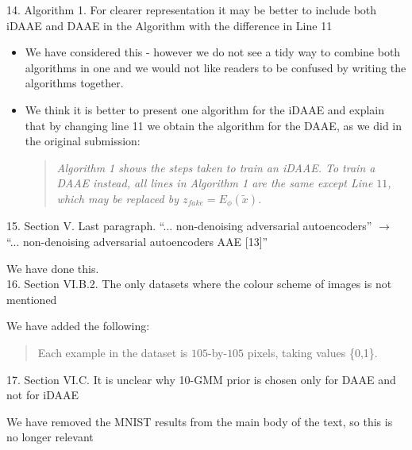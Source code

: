 \documentclass[a4paper,11pt]{article}
\begin{document}

{\color{blue}
14. Algorithm 1. For clearer representation it may be better to include both iDAAE and DAAE in the Algorithm with the difference in Line 11}

\begin{itemize}
    \item We have considered this - however we do not see a tidy way to combine both algorithms in one and we would not like readers to be confused by writing the algorithms together.
    \item We think it is better to present one algorithm for the iDAAE and explain that by changing line 11 we obtain the algorithm for the DAAE, as we did in the original submission:
    \begin{quote}
        {\it Algorithm 1 shows the steps taken to train an iDAAE. To train a DAAE instead, all lines in Algorithm 1 are the same except Line $11$, which may be replaced by $z_{fake} = E_\phi(\tilde{x})$.}
    \end{quote}
\end{itemize}

{\color{blue}
15. Section V. Last paragraph. ``... non-denoising adversarial autoencoders'' $\rightarrow$ ``... non-denoising adversarial autoencoders AAE [13]''} \newline

We have done this.\\

{\color{blue}
16. Section VI.B.2. The only datasets where the colour scheme of images is not mentioned} \newline

We have added the following: 
\begin{quote}
     {\color{red} Each example in the dataset is $105$-by-$105$ pixels, taking values \{0,1\}. }
\end{quote}

{\color{blue}
17. Section VI.C. It is unclear why 10-GMM prior is chosen only for DAAE and not for iDAAE} \newline

{\color{red} We have removed the MNIST results from the main body of the text, so this is no longer relevant}
\end{document}
